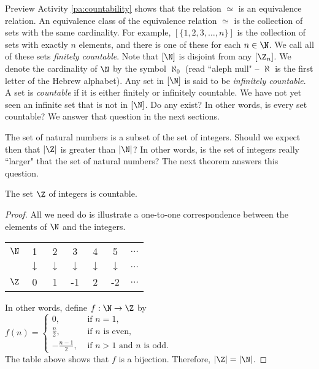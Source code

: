 
\label{sec_count_set}

Preview Activity \ref{pa:countability} shows that the relation $\simeq$ is an equivalence relation. An equivalence class of the equivalence relation $\simeq$ is the collection of sets with the same cardinality. For example, $[\{1,2,3, \ldots, n\}]$ is the collection of sets with exactly $n$ elements, and there is one of these for each $n \in \N$. We call all of these sets \emph{finitely countable}. Note that $[\N]$ is disjoint from any $[\Z_n]$. We denote the cardinality of $\N$ by the symbol $\aleph_0$ (read ``aleph null" -- $\aleph$ is the first letter of the Hebrew alphabet). Any set in $[\N]$ is said to be \emph{infinitely countable}. A set is \emph{countable} if it is either finitely or infinitely countable. We have not yet seen an infinite set that is not in $[\N]$. Do any exist? In other words, is every set countable? We answer that question in the next sections. 

\label{sec_card_set_int}
The set of natural numbers is a subset of the set of integers. Should we expect then that $|\Z|$ is greater than $|\N|$? In other words, is the set of integers really ``larger" that the set of natural numbers? The next theorem answers this question. 

\begin{theorem} The set $\Z$ of integers is countable.
\end{theorem}

\begin{proof} All we need do is illustrate a one-to-one correspondence between the elements of $\N$ and the integers. 
\begin{center}
\begin{tabular}{c c c c c c c} \\
$\N$ &1 &2 &3 &4 &5 &$\ldots$ \\
	&$\downarrow$ &$\downarrow$ &$\downarrow$ &$\downarrow$ &$\downarrow$ &$\ldots$ \\
$\Z$ &0 &1 &-1 &2 &-2 &$\ldots$
\end{tabular}
\end{center}
In other words, define $f : \N \to \Z$ by $f(n) = 
\begin{cases}
0, &\text{ if $n=1$}, \\
\frac{n}{2}, &\text{ if $n$ is even}, \\
-\frac{n-1}{2}, &\text{ if $n>1$ and $n$ is odd.}
\end{cases}$ \\

The table above shows that $f$ is a bijection. Therefore, $|\Z| = |\N|$. 
\end{proof}

